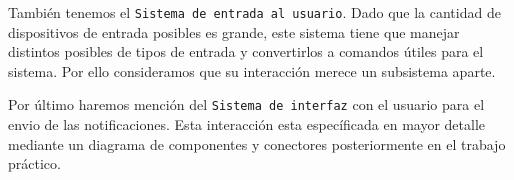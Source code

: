 También tenemos el \texttt{Sistema de entrada al usuario}. Dado que la 
cantidad de dispositivos de entrada posibles es grande, este sistema tiene 
que manejar distintos posibles de tipos de entrada y convertirlos a 
comandos útiles para el sistema. 
Por ello consideramos que su interacción merece un subsistema aparte.

Por último haremos mención del \texttt{Sistema de interfaz} con el usuario para el envio de las notificaciones. Esta interacción esta específicada en mayor
detalle mediante un diagrama de componentes y conectores posteriormente en
el trabajo práctico.

